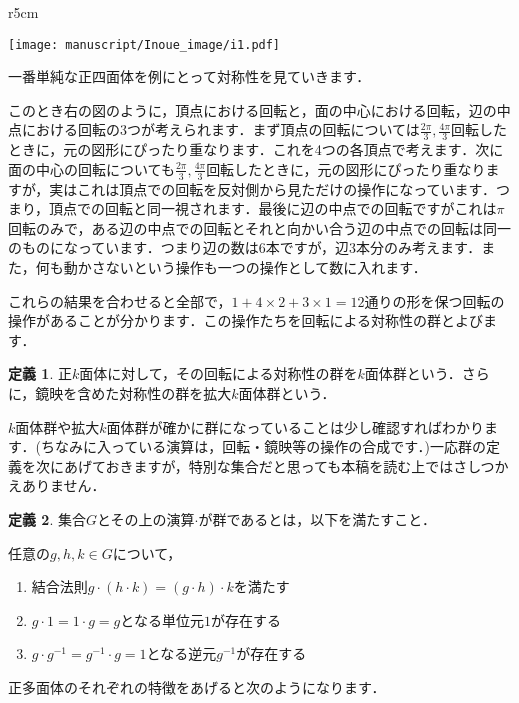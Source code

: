 \documentclass[/main]{subfiles} %
\theoremstyle{definition} %
\newtheorem{idefi}{定義}[section]
\begin{document}
\begin{wrapfigure}{r}{5cm}
  \vspace{-2\baselineskip}
  \begin{center}
  \texttt{[image: manuscript/Inoue\_image/i1.pdf]}
  \end{center}
  \vspace{-1\baselineskip}
\end{wrapfigure}

 
一番単純な正四面体を例にとって対称性を見ていきます．

このとき右の図のように，頂点における回転と，面の中心における回転，辺の中点における回転の$3$つが考えられます．まず頂点の回転については$\frac{2\pi}{3},\frac{4\pi}{3}$回転したときに，元の図形にぴったり重なります．これを4つの各頂点で考えます．次に面の中心の回転についても$\frac{2\pi}{3},\frac{4\pi}{3}$回転したときに，元の図形にぴったり重なりますが，実はこれは頂点での回転を反対側から見ただけの操作になっています．つまり，頂点での回転と同一視されます．最後に辺の中点での回転ですがこれは$\pi$回転のみで，ある辺の中点での回転とそれと向かい合う辺の中点での回転は同一のものになっています．つまり辺の数は6本ですが，辺3本分のみ考えます．また，何も動かさないという操作も一つの操作として数に入れます．

これらの結果を合わせると全部で，$1+4\times2 +3 \times 1 =12$通りの形を保つ回転の操作があることが分かります．この操作たちを回転による対称性の群とよびます．
\begin{idefi}
  正$k$面体に対して，その回転による対称性の群を$k$面体群という．さらに，鏡映を含めた対称性の群を拡大$k$面体群という．
\end{idefi}
$k$面体群や拡大$k$面体群が確かに群になっていることは少し確認すればわかります．(ちなみに入っている演算は，回転・鏡映等の操作の合成です．)一応群の定義を次にあげておきますが，特別な集合だと思っても本稿を読む上ではさしつかえありません．
\begin{idefi}
  集合$G$とその上の演算$\cdot$が群であるとは，以下を満たすこと．
  
  任意の$g,h,k \in G$について，
  \begin{enumerate}
  \item 結合法則$g\cdot(h\cdot k)=(g\cdot h)\cdot k$を満たす
  \item $g\cdot 1=1 \cdot g=g$となる単位元$1$が存在する
  \item $g\cdot g^{-1}=g^{-1}\cdot g=1$となる逆元$g^{-1}$が存在する
  \end{enumerate}
\end{idefi}
正多面体のそれぞれの特徴をあげると次のようになります．
\end{document}
